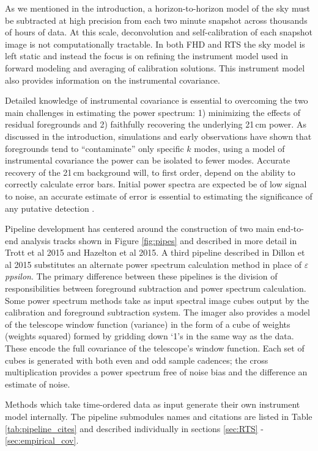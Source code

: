 \documentclass[preprint2]{aastex}
\def\eppsilon{{\it $\varepsilon$ppsilon}}
\def\chipscite{Trott et al 2015}
\def\eppsiloncite{Hazelton et al 2015}
\def\dilloncite{Dillon et al 2015 }
\begin{document}
As we mentioned in the introduction, a horizon-to-horizon model of the sky must be subtracted at high precision from each two minute snapshot across thousands of hours of data. At this scale, deconvolution and self-calibration of each snapshot image is not computationally tractable.  In both FHD and RTS the sky model is left static and instead the focus is on refining the instrument model used in forward modeling and averaging of calibration solutions.  This instrument model also provides information on the instrumental covariance.


Detailed knowledge of instrumental covariance is essential to overcoming the two main challenges in estimating the power spectrum: 1) minimizing the effects of residual foregrounds and 2) faithfully recovering the underlying 21\,cm power.   As discussed in the introduction, simulations and early observations have shown that foregrounds tend to ``contaminate'' only specific $k$ modes, using a model of instrumental covariance the power can be isolated to fewer modes.  Accurate recovery of the 21\,cm background will, to first order, depend on the ability to correctly calculate error bars.  Initial power spectra are expected be of low signal to noise, an accurate estimate of error is essential to estimating the significance of any putative detection \citep{Pober:2014p10390,Beardsley:2013p9952}. 

Pipeline development has centered around the construction of two main end-to-end analysis tracks shown in Figure \ref{fig:pipes} and described in more detail in \chipscite{} and \eppsiloncite{}. A third pipeline described in \dilloncite{} substitutes an alternate power spectrum calculation method in place of \eppsilon{}. The primary difference between these pipelines is the division of responsibilities between foreground subtraction and power spectrum calculation. Some power spectrum methods take as input spectral image cubes output by the calibration and foreground subtraction system.  The imager also provides a model of the telescope window function (variance) in the form of a cube of weights (weights squared) formed by gridding down `1's in the same way as the data. These encode the full covariance of the telescope's window function.  Each set of cubes is generated with both even and odd sample cadences; the cross multiplication provides a power spectrum free of noise bias and the difference an estimate of noise.

Methods which take time-ordered data as input generate their own instrument model internally.  The pipeline submodules names and citations are listed in Table \ref{tab:pipeline_cites} and described individually in sections \ref{sec:RTS} - \ref{sec:empirical_cov}.  
\end{document}
